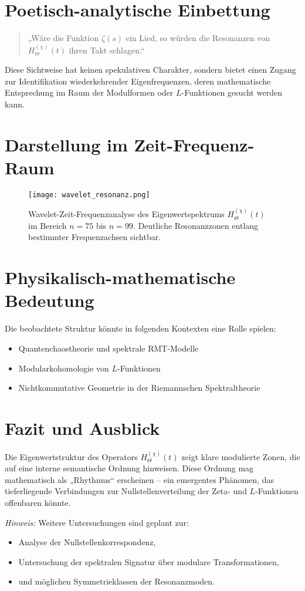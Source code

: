 \documentclass[a4paper,12pt]{article}
\begin{document}
\section{Poetisch-analytische Einbettung}

\begin{quote}

„Wäre die Funktion $\zeta(s)$ ein Lied, so würden die Resonanzen von $H_{\Theta}^{(\chi)}(t)$ ihren Takt schlagen.“
\end{quote}

Diese Sichtweise hat keinen spekulativen Charakter, sondern bietet einen Zugang zur Identifikation wiederkehrender Eigenfrequenzen, deren mathematische Entsprechung im Raum der Modulformen oder $L$-Funktionen gesucht werden kann.

\section{Darstellung im Zeit-Frequenz-Raum}

\begin{figure}[h!]
    \centering
    \texttt{[image: wavelet\_resonanz.png]} %
    \caption{Wavelet-Zeit-Frequenzanalyse des Eigenwertspektrums $H_{\Theta}^{(\chi)}(t)$ im Bereich $n = 75$ bis $n = 99$. Deutliche Resonanzzonen entlang bestimmter Frequenzachsen sichtbar.}
    \label{fig:wavelet_resonanz}
\end{figure}

\section{Physikalisch-mathematische Bedeutung}

Die beobachtete Struktur könnte in folgenden Kontexten eine Rolle spielen:
\begin{itemize}
    \item Quantenchaostheorie und spektrale RMT-Modelle
    \item Modularkohomologie von $L$-Funktionen
    \item Nichtkommutative Geometrie in der Riemannschen Spektraltheorie
\end{itemize}

\section{Fazit und Ausblick}

Die Eigenwertstruktur des Operators $H_{\Theta}^{(\chi)}(t)$ zeigt klare modulierte Zonen, die auf eine interne semantische Ordnung hinweisen. Diese Ordnung mag mathematisch als „Rhythmus“ erscheinen – ein emergentes Phänomen, das tieferliegende Verbindungen zur Nullstellenverteilung der Zeta- und $L$-Funktionen offenbaren könnte.

\vspace{1cm}

\noindent
\textit{Hinweis:} Weitere Untersuchungen sind geplant zur:
\begin{itemize}
    \item Analyse der Nullstellenkorrespondenz,
    \item Untersuchung der spektralen Signatur über modulare Transformationen,
    \item und möglichen Symmetrieklassen der Resonanzmoden.
\end{itemize}
\end{document}
